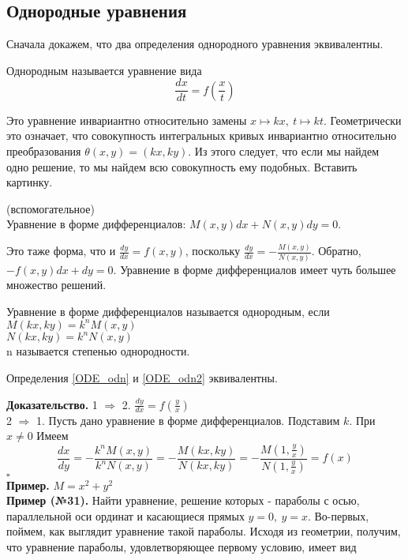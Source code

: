 \subsection{Однородные уравнения}
Сначала докажем, что два определения однородного уравнения эквивалентны.
\begin{defin}
Однородным называется уравнение вида
\begin{equation}\label{ODE_odn1}
    \frac{dx}{dt}=f\left(\frac{x}{t}\right) \label{ODE_odn}
\end{equation} 
\end{defin}
Это уравнение инвариантно относительно замены $x\mapsto kx,~t\mapsto kt$.
Геометрически это означает, что совокупность интегральных кривых инвариантно
относительно преобразования $\theta(x,y)=(kx,ky)$.
Из этого следует, что если мы найдем одно решение, то мы найдем всю 
совокупность ему подобных. Вставить картинку.
\begin{defin}
    (вспомогательное)\\
Уравнение в форме дифференциалов:
    $M(x,y)dx+N(x,y)dy=0$.  
\end{defin}
Это таже форма, что и $\frac{dy}{dx}=f(x,y)$, поскольку 
$\frac{dy}{dx}=-\frac{M(x,y)}{N(x,y)}$. Обратно, $-f(x,y)dx+dy=0$.
Уравнение в форме дифференциалов имеет чуть большее множество решений. 
\begin{defin}\label{ODE_odn2}
Уравнение в форме дифференциалов называется однородным, если\\
$M(kx,ky)=k^nM(x,y)$\\ 
$N(kx,ky)=k^nN(x,y)$\\
n называется степенью однородности.
\end{defin}
\begin{theor}
    Определения \ref{ODE_odn} и \ref{ODE_odn2} эквивалентны. 
\end{theor}
\textbf{Доказательство.} 1 $\Rightarrow$ 2. $\frac{dy}{dx}=f(\frac{y}{x})$\\
2 $\Rightarrow$ 1. Пусть дано уравнение в форме дифференциалов. Подставим $k$.
При $x\ne 0$ Имеем $$\frac{dx}{dy}=-\frac{k^nM(x,y)}{k^nN(x,y)}=
-\frac{M(kx,ky)}{N(kx,ky)}=-\frac{M(1,\frac{y}{x})}{N(1,\frac{y}{x})}=f(x)$$
$\square$ \\
\textbf{Пример.} $M=x^2+y^2$\\
\textbf{Пример (№31).} Найти уравнение, решение которых - параболы с осью, 
параллельной оси ординат и касающиеся прямых $y=0,~y=x$. 
Во-первых, поймем, как выглядит уравнение такой параболы. Исходя из геометрии,
получим, что уравнение параболы, удовлетворяющее первому условию, имеет вид 

